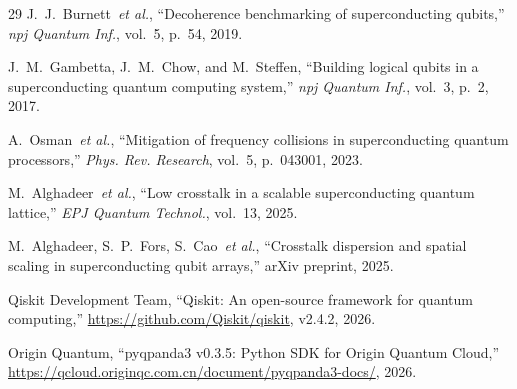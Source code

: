 \documentclass[ASNA,twocolumn]{USG}
\begin{document}
\begin{thebibliography}{29}
J.~J.~Burnett~\emph{et al.}, ``Decoherence benchmarking of superconducting qubits,'' \emph{npj Quantum Inf.}, vol.~5, p.~54, 2019.

J.~M.~Gambetta, J.~M.~Chow, and M.~Steffen, ``Building logical qubits in a superconducting quantum computing system,'' \emph{npj Quantum Inf.}, vol.~3, p.~2, 2017.

A.~Osman~\emph{et al.}, ``Mitigation of frequency collisions in superconducting quantum processors,'' \emph{Phys. Rev. Research}, vol.~5, p.~043001, 2023.

M.~Alghadeer~\emph{et al.}, ``Low crosstalk in a scalable superconducting quantum lattice,'' \emph{EPJ Quantum Technol.}, vol.~13, 2025.

M.~Alghadeer, S.~P.~Fors, S.~Cao~\emph{et al.}, ``Crosstalk dispersion and spatial scaling in superconducting qubit arrays,'' arXiv preprint, 2025.

Qiskit Development Team, ``Qiskit: An open-source framework for quantum computing,'' \url{https://github.com/Qiskit/qiskit}, v2.4.2, 2026.

Origin Quantum, ``pyqpanda3 v0.3.5: Python SDK for Origin Quantum Cloud,'' \url{https://qcloud.originqc.com.cn/document/pyqpanda3-docs/}, 2026.

\end{thebibliography}
\end{document}
